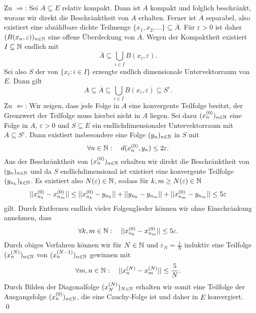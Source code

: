 \begin{proof*}
    Zu $\Rightarrow$: Sei $A \subseteq E$ relativ kompakt. Dann ist $\overline{A}$ kompakt und folglich beschränkt, woraus wir direkt die Beschränktheit von $A$ erhalten. 
    Ferner ist $\overline{A}$ separabel, also existiert eine abzählbare dichte Teilmenge $\{x_1, x_2,...\} \subseteq \overline{A}$. 
    Für $\varepsilon > 0$ ist daher $(B(x_n, \varepsilon))_{n \in \mathbb{N}}$ eine offene Überdeckung von $\overline{A}$. Wegen der Kompaktheit existiert $I \subseteq \mathbb{N}$ endlich mit 
    $$
        \overline{A} \subseteq \bigcup_{i \in I}B(x_i, \varepsilon).
    $$
    Sei also $S$ der von $\{x_i : i \in I\}$ erzeugte endlich dimensionale Untervektorraum von $E$. Dann gilt 
    $$
        A \subseteq \overline{A} \subseteq \bigcup_{i \in I}B(x_i, \varepsilon) \subseteq S^{\varepsilon}.
    $$
    Zu $\Leftarrow$: Wir zeigen, dass jede Folge in $A$ eine konvergente Teilfolge besitzt, der Grenzwert der Teilfolge muss hierbei nicht in $A$ liegen. 
    Sei dazu $(x^{(0)}_n)_{n \in \mathbb{N}}$ eine Folge in $A$, $\varepsilon > 0$ und $S \subseteq E$ ein endlichdimensionaler Untervektorraum mit $A \subseteq S^{\varepsilon}$. 
    Dann existiert insbesondere eine Folge $(y_n)_{n \in \mathbb{N}}$ in $S$ mit 
    $$
        \forall n \in \mathbb{N}: \quad d(x^{(0)}_n, y_n) \leq 2\varepsilon.
    $$
    Aus der Beschränktheit von $(x^{(0)}_n)_{n \in \mathbb{N}}$ erhalten wir direkt die Beschränktheit von $(y_n)_{n \in \mathbb{N}}$ und da $S$ endlichdimensional ist existiert eine konvergente Teilfolge $(y_{n_k})_{k \in \mathbb{N}}$.
    Es existiert also $N(\varepsilon) \in \mathbb{N}$, sodass für $k,m \geq N(\varepsilon) \in \mathbb{N}$
    \begin{align*}
        \lvert\lvert x^{(0)}_{n_k} - x^{(0)}_{n_m} \rvert\rvert \leq \lvert\lvert x^{(0)}_{n_k} - y_{n_k} \rvert\rvert + \lvert\lvert y_{n_k} - y_{n_m} \rvert\rvert + \lvert\lvert x^{(0)}_{n_m} - y_{n_m} \rvert\rvert \leq 5\varepsilon
    \end{align*}
    gilt. 
    Durch Entfernen endlich vieler Folgenglieder können wir ohne Einschränkung annehmen, dass 
    $$
        \forall k,m \in \mathbb{N}: \quad \lvert\lvert x^{(0)}_{n_k} - x^{(0)}_{n_m} \rvert\rvert \leq 5\varepsilon. 
    $$
    Durch obiges Verfahren können wir für $N \in \mathbb{N}$ und $\varepsilon_N = \frac{1}{N}$ induktiv eine Teilfolge $(x^{(N)}_n)_{n \in \mathbb{N}}$ von $(x^{(N-1)}_n)_{n \in \mathbb{N}}$ gewinnen mit
    $$
        \forall m,n \in \mathbb{N}: \quad \lvert\lvert x^{(N)}_n - x^{(N)}_m \rvert\rvert \leq \frac{5}{N}.
    $$
    Durch Bilden der Diagonalfolge $(x^{(N)}_N)_{N \in \mathbb{N}}$ erhalten wir somit eine Teilfolge der Ausgangsfolge $(x^{(0)}_n)_{n \in \mathbb{N}}$, die eine Cauchy-Folge ist und daher in $E$ konvergiert. 
    \qed 
\end{proof*}

